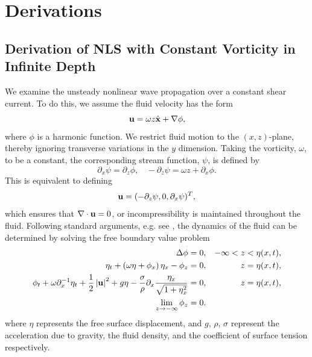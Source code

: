 \documentclass[a4paper,11pt]{article}
\newcommand{\p}{\partial}
\begin{document}
\section{Derivations}
\subsection{Derivation of NLS with Constant Vorticity in Infinite Depth}
We examine the unsteady nonlinear wave propagation over a constant shear current.  To do this, we assume the fluid velocity has the form
\[
{\bf u} = \omega z\hat{{\bf x}} + \nabla \phi, 
\]
where $\phi$ is a harmonic function.  We restrict fluid motion to the $(x,z)$-plane, thereby ignoring transverse variations in the $y$ dimension.  Taking the vorticity, $\omega$, to be a constant, the corresponding stream function, $\psi$, is defined by
\[
\p_{x}\psi = \p_{z}\phi, ~~~~ -\p_{z}\psi = \omega z + \p_{x}\phi.
\]
This is equivalent to defining 
\[
{\bf u}= (-\p_{z}\psi,0,\p_{x}\psi)^{T}, 
\]
which ensures that $\nabla \cdot {\bf u} = 0$, or incompressibility is
maintained throughout the fluid.  Following standard arguments,
e.g. see \cite{ashton}, the dynamics of the fluid can be determined by
solving the free boundary value problem
\begin{align}
\Delta \phi = 0, & & -\infty< z < \eta(x,t), \nonumber \\
\eta_{t} +\left(\omega\eta+\phi_{x}\right)\eta_{x} - \phi_{z} = 0, & & z=\eta(x,t), \label{kine}\\
\phi_{t} + \omega\p_{x}^{-1}\eta_{t} + \frac{1}{2} \left|{\bf
    u}\right|^{2} + g\eta -
\frac{\sigma}{\rho}\p_{x}\frac{\eta_{x}}{\sqrt{1+\eta_{x}^{2}}}= 0, &
& z=\eta(x,t), \label{bernou}\\
\lim_{z\rightarrow -\infty} \phi_{z} = 0. \nonumber
\end{align}
where $\eta$ represents the free surface displacement, and $g$, 
$\rho$, $\sigma$ represent the acceleration due to gravity, the fluid
density, and the coefficient of surface tension respectively.
\end{document}

